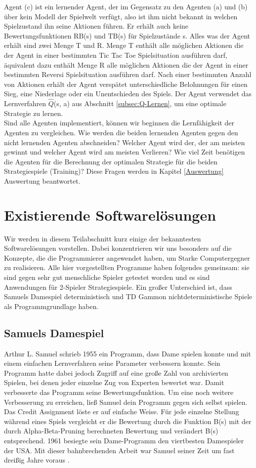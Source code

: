 Agent (c) ist ein lernender Agent, der im Gegensatz zu den Agenten (a) und (b) über kein Modell der Spielwelt verfügt, also ist ihm nicht bekannt in welchen Spielzustand ihn seine Aktionen führen. Er erhält auch keine Bewertungsfunktionen RB(s) und TB(s) für Spielzustände s. Alles was der Agent erhält sind zwei Menge T und R. Menge T enthält alle möglichen Aktionen die der Agent in einer bestimmten Tic Tac Toe Spielsituation ausführen darf, äquivalent dazu enthält Menge R alle möglichen Aktionen die der Agent in einer bestimmten Reversi Spielsituation ausführen darf. Nach einer bestimmten Anzahl von Aktionen erhält der Agent verspätet unterschiedliche Belohnungen für einen Sieg, eine Niederlage oder ein Unentschieden des Spiels. Der Agent verwendet das Lernverfahren $\hat{Q}$(s, a) aus Abschnitt  \ref{subsec:Q-Lernen}, um eine optimale Strategie zu lernen. \\

Sind alle Agenten implementiert, können wir beginnen die Lernfähigkeit der Agenten zu vergleichen. Wie werden die beiden lernenden Agenten gegen den nicht lernenden Agenten abschneiden? Welcher Agent wird der, der am meisten gewinnt und welcher Agent wird am meisten Verlieren? Wie viel Zeit benötigen die Agenten für die Berechnung der optimalen Strategie für die beiden Strategiespiele (Training)? Diese Fragen werden in Kapitel \ref{Auswertung} Auswertung beantwortet.

\section{Existierende Softwarelösungen}
Wir werden in diesem Teilabschnitt kurz einige der bekanntesten Softwarelösungen vorstellen. Dabei konzentrieren wir uns besonders auf die Konzepte, die die Programmierer angewendet haben, um Starke Computergegner zu realisieren. Alle hier vorgestellten Programme haben folgendes gemeinsam: sie sind gegen sehr gut menschliche Spieler getestet worden und es sind Anwendungen für 2-Spieler Strategiespiele. Ein großer Unterschied ist, dass Samuels Damespiel deterministisch und TD Gammon nichtdeterministische Spiele als Programmgrundlage haben.

\subsection{Samuels Damespiel}
\label{subsec:Samuels Damespiel}
Arthur L. Samuel schrieb 1955 ein Programm, dass Dame spielen konnte und mit einem einfachen Lernverfahren seine Parameter verbessern konnte. Sein Programm hatte dabei jedoch Zugriff auf eine große Zahl von archivierten Spielen, bei denen jeder einzelne Zug von Experten bewertet war. Damit verbesserte das Programm seine Bewertungsfunktion. Um eine noch weitere Verbesserung zu erreichen, ließ Samuel dein Programm gegen sich selbst spielen. Das Credit Assignment löste er auf einfache Weise. Für jede einzelne Stellung während eines Spiels vergleicht er die Bewertung durch die Funktion B(s) mit der durch Alpha-Beta-Pruning berechneten Bewertung und verändert B(s) entsprechend. 1961 besiegte sein Dame-Programm den viertbesten Damespieler der USA. Mit dieser bahnbrechenden Arbeit war Samuel seiner Zeit um fast dreißig Jahre voraus \cite[120\psq]{Ertel}.


